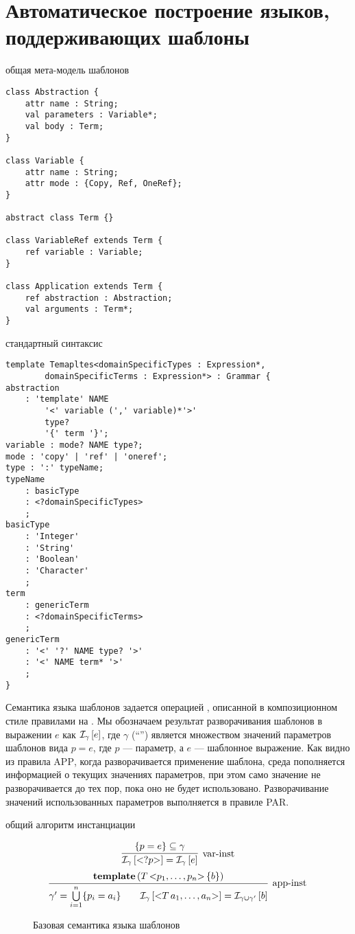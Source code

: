 \chapter{Автоматическое построение языков, поддерживающих шаблоны}

общая мета-модель шаблонов

\begin{lstlisting}
class Abstraction {
	attr name : String;
	val parameters : Variable*;
	val body : Term;
}

class Variable {
	attr name : String;
	attr mode : {Copy, Ref, OneRef};
}

abstract class Term {}

class VariableRef extends Term {
	ref variable : Variable;
}

class Application extends Term {
	ref abstraction : Abstraction;
	val arguments : Term*;
}
\end{lstlisting}

стандартный синтаксис
\begin{lstlisting}
template Temapltes<domainSpecificTypes : Expression*, 
		domainSpecificTerms : Expression*> : Grammar {
abstraction 
	: 'template' NAME 
		'<' variable (',' variable)*'>' 
		type? 
		'{' term '}';
variable : mode? NAME type?;
mode : 'copy' | 'ref' | 'oneref';
type : ':' typeName;
typeName
	: basicType
	: <?domainSpecificTypes>
	;
basicType
	: 'Integer'
	: 'String'
	: 'Boolean'
	: 'Character'
	;
term
	: genericTerm
	: <?domainSpecificTerms>
	;
genericTerm
	: '<' '?' NAME type? '>'
	: '<' NAME term* '>'
	;
}
\end{lstlisting}

Семантика языка шаблонов задается операцией , описанной в композиционном стиле правилами на . Мы обозначаем результат разворачивания шаблонов в выражении $e$ как $\mathcal{I}_{\gamma} \left[ e \right]$, где $\gamma$ (``'') является множеством значений параметров шаблонов вида $p = e$, где $p$ --- параметр, а $e$ --- шаблонное выражение. Как видно из правила \textsc{APP}, когда разворачивается применение шаблона, среда пополняется информацией о текущих значениях параметров, при этом само значение не разворачивается до тех пор, пока оно не будет использовано. Разворачивание значений использованных параметров выполняется в правиле \textsc{PAR}.

общий алгоритм инстанциации
\begin{figure}[htbp]
	\centering
$$
\trule{
	\{p = e\} \subseteq \gamma
}{
	\Inst{\gamma}{\ang{?p}} = \Inst{\gamma}{e}
}{var-inst}
$$ 
$$
\trule{
	\mathbf{template}\left(
		T \, \ang{p_1, \ldots, p_n} \, \{ b \}
	\right)
}{
	\gamma' = \bigcup\limits_{i=1}^{n} \{ p_i = a_i \}
	\qquad
	\Inst{\gamma}{\ang{T \, a_1, \ldots, a_n}} = \Inst{\gamma \cup \gamma'}{b}
}{app-inst}
$$
	\caption{Базовая семантика языка шаблонов}\label{TempSem}
\end{figure}


